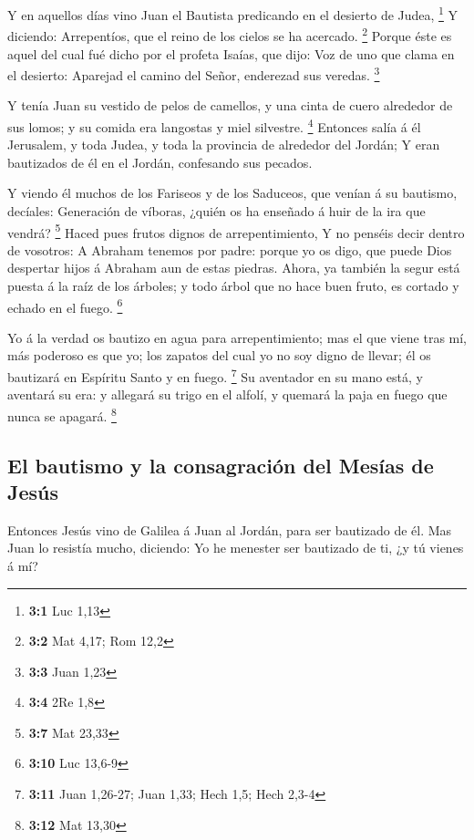  Y en aquellos días vino Juan el Bautista predicando en el
desierto de Judea, \footnote{\textbf{3:1} Luc 1,13}  Y
diciendo: Arrepentíos, que el reino de los cielos se ha acercado.
\footnote{\textbf{3:2} Mat 4,17; Rom 12,2}  Porque éste es
aquel del cual fué dicho por el profeta Isaías, que dijo: Voz de uno que
clama en el desierto: Aparejad el camino del Señor, enderezad sus
veredas. \footnote{\textbf{3:3} Juan 1,23}

 Y tenía Juan su vestido de pelos de camellos, y una cinta
de cuero alrededor de sus lomos; y su comida era langostas y miel
silvestre. \footnote{\textbf{3:4} 2Re 1,8}  Entonces salía
á él Jerusalem, y toda Judea, y toda la provincia de alrededor del
Jordán;  Y eran bautizados de él en el Jordán, confesando
sus pecados.

 Y viendo él muchos de los Fariseos y de los Saduceos, que
venían á su bautismo, decíales: Generación de víboras, ¿quién os ha
enseñado á huir de la ira que vendrá? \footnote{\textbf{3:7} Mat 23,33}
 Haced pues frutos dignos de arrepentimiento,
 Y no penséis decir dentro de vosotros: A Abraham tenemos
por padre: porque yo os digo, que puede Dios despertar hijos á Abraham
aun de estas piedras.  Ahora, ya también la segur está
puesta á la raíz de los árboles; y todo árbol que no hace buen fruto, es
cortado y echado en el fuego. \footnote{\textbf{3:10} Luc 13,6-9}

 Yo á la verdad os bautizo en agua para arrepentimiento;
mas el que viene tras mí, más poderoso es que yo; los zapatos del cual
yo no soy digno de llevar; él os bautizará en Espíritu Santo y en fuego.
\footnote{\textbf{3:11} Juan 1,26-27; Juan 1,33; Hech 1,5; Hech 2,3-4}
 Su aventador en su mano está, y aventará su era: y
allegará su trigo en el alfolí, y quemará la paja en fuego que nunca se
apagará. \footnote{\textbf{3:12} Mat 13,30}

\hypertarget{el-bautismo-y-la-consagraciuxf3n-del-mesuxedas-de-jesuxfas}{%
\subsection{El bautismo y la consagración del Mesías de
Jesús}\label{el-bautismo-y-la-consagraciuxf3n-del-mesuxedas-de-jesuxfas}}

 Entonces Jesús vino de Galilea á Juan al Jordán, para
ser bautizado de él.  Mas Juan lo resistía mucho,
diciendo: Yo he menester ser bautizado de ti, ¿y tú vienes á mí?

